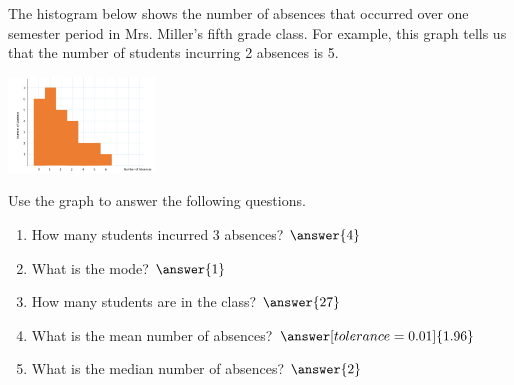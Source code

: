 \documentclass{ximera}
\begin{document}
\begin{problem}\label{prob:140hom2prob3}
The histogram below shows the number of absences that occurred over one semester period in Mrs. Miller's fifth grade class.  For example, this graph tells us that the number of students incurring 2 absences is 5.

\begin{image}
   \includegraphics[height=1in]{140H2pic6.jpg}
 \end{image}
 
 Use the graph to answer the following questions.
 
 \begin{enumerate}
     \item How many students incurred 3 absences? $\answer{4}$
     \item What is the mode? $\answer{1}$
     \item How many students are in the class? $\answer{27}$
     \item What is the mean number of absences? $\answer[tolerance=0.01]{1.96}$
     \item What is the median number of absences? $\answer{2}$
 \end{enumerate}
\end{problem}
\end{document}
